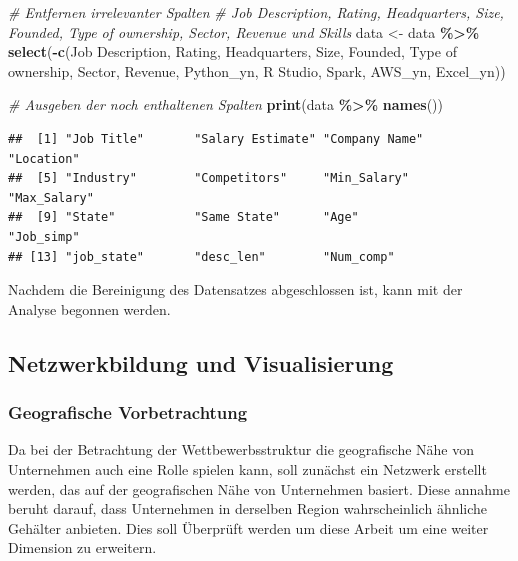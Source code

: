 \documentclass[
]{article}
\newenvironment{Shaded}{\begin{snugshade}}{\end{snugshade}}
\newcommand{\AttributeTok}[1]{\textcolor[rgb]{0.13,0.29,0.53}{#1}}
\newcommand{\CommentTok}[1]{\textcolor[rgb]{0.56,0.35,0.01}{\textit{#1}}}
\newcommand{\FunctionTok}[1]{\textcolor[rgb]{0.13,0.29,0.53}{\textbf{#1}}}
\newcommand{\NormalTok}[1]{#1}
\newcommand{\OtherTok}[1]{\textcolor[rgb]{0.56,0.35,0.01}{#1}}
\newcommand{\SpecialCharTok}[1]{\textcolor[rgb]{0.81,0.36,0.00}{\textbf{#1}}}
\newcommand{\StringTok}[1]{\textcolor[rgb]{0.31,0.60,0.02}{#1}}
\begin{document}
\begin{Shaded}
\begin{Highlighting}[]
\CommentTok{\# Entfernen irrelevanter Spalten}
\CommentTok{\# Job Description, Rating, Headquarters, Size, Founded, Type of ownership, Sector, Revenue und Skills}
\NormalTok{data }\OtherTok{\textless{}{-}}\NormalTok{ data }\SpecialCharTok{\%\textgreater{}\%}
  \FunctionTok{select}\NormalTok{(}\SpecialCharTok{{-}}\FunctionTok{c}\NormalTok{(}\StringTok{\textasciigrave{}}\AttributeTok{Job Description}\StringTok{\textasciigrave{}}\NormalTok{, Rating, Headquarters, Size, Founded,}
            \StringTok{\textasciigrave{}}\AttributeTok{Type of ownership}\StringTok{\textasciigrave{}}\NormalTok{, Sector, Revenue,}
\NormalTok{            Python\_yn, }\StringTok{\textasciigrave{}}\AttributeTok{R Studio}\StringTok{\textasciigrave{}}\NormalTok{, Spark, AWS\_yn, Excel\_yn))}

\CommentTok{\# Ausgeben der noch enthaltenen Spalten}
\FunctionTok{print}\NormalTok{(data }\SpecialCharTok{\%\textgreater{}\%} \FunctionTok{names}\NormalTok{())}
\end{Highlighting}
\end{Shaded}

\begin{verbatim}
##  [1] "Job Title"       "Salary Estimate" "Company Name"    "Location"       
##  [5] "Industry"        "Competitors"     "Min_Salary"      "Max_Salary"     
##  [9] "State"           "Same State"      "Age"             "Job_simp"       
## [13] "job_state"       "desc_len"        "Num_comp"
\end{verbatim}

Nachdem die Bereinigung des Datensatzes abgeschlossen ist, kann mit der
Analyse begonnen werden.

\subsection{Netzwerkbildung und
Visualisierung}\label{netzwerkbildung-und-visualisierung}

\subsubsection{Geografische
Vorbetrachtung}\label{geografische-vorbetrachtung}

Da bei der Betrachtung der Wettbewerbsstruktur die geografische Nähe von
Unternehmen auch eine Rolle spielen kann, soll zunächst ein Netzwerk
erstellt werden, das auf der geografischen Nähe von Unternehmen basiert.
Diese annahme beruht darauf, dass Unternehmen in derselben Region
wahrscheinlich ähnliche Gehälter anbieten. Dies soll Überprüft werden um
diese Arbeit um eine weiter Dimension zu erweitern.
\end{document}

